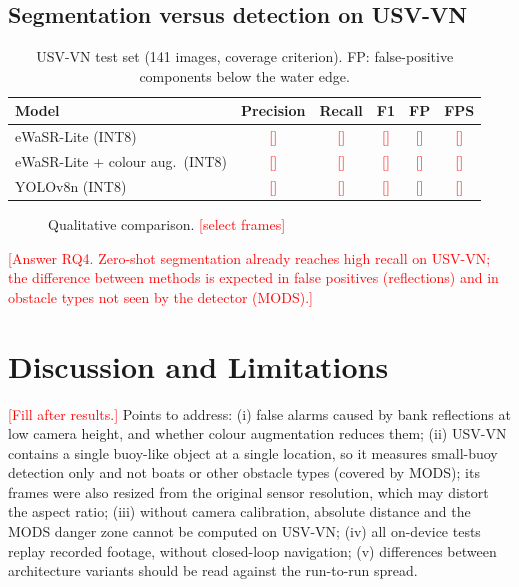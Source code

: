 \documentclass[conference]{IEEEtran}
\newcommand{\tbd}[1]{\textcolor{red}{[#1]}}
\newcommand{\figplaceholder}[2]{\fbox{\parbox[c][#2][c]{0.95\linewidth}{\centering\small\textcolor{red}{#1}}}}
\begin{document}
\subsection{Segmentation versus detection on USV-VN}
\label{sec:yolo}
\begin{table}[t]
\centering
\caption{USV-VN test set (141 images, coverage criterion). FP: false-positive components below the water edge.}
\label{tab:yolo}
\setlength{\tabcolsep}{4pt}
\begin{tabular}{lccccc}
\toprule
Model & Precision & Recall & F1 & FP & FPS \\
\midrule
eWaSR-Lite (INT8)                  & \tbd{} & \tbd{} & \tbd{} & \tbd{} & \tbd{} \\
eWaSR-Lite + colour aug.\ (INT8)   & \tbd{} & \tbd{} & \tbd{} & \tbd{} & \tbd{} \\
YOLOv8n (INT8)                  & \tbd{} & \tbd{} & \tbd{} & \tbd{} & \tbd{} \\
\bottomrule
\end{tabular}
\end{table}

\begin{figure}[t]
\centering
\figplaceholder{Fig.~4: qualitative examples — (a) obstacle found by segmentation but missed by YOLOv8n; (b) false alarms on bank reflections; (c) MODS frame with an object class absent from USV-VN.}{3.6cm}
\caption{Qualitative comparison. \tbd{select frames}}
\label{fig:qual}
\end{figure}
\tbd{Answer RQ4. Zero-shot segmentation already reaches high recall on USV-VN; the difference between methods is expected in false positives (reflections) and in obstacle types not seen by the detector (MODS).}

\section{Discussion and Limitations}
\tbd{Fill after results.} Points to address: (i) false alarms caused by bank reflections at low camera height, and whether colour augmentation reduces them; (ii) USV-VN contains a single buoy-like object at a single location, so it measures small-buoy detection only and not boats or other obstacle types (covered by MODS); its frames were also resized from the original sensor resolution, which may distort the aspect ratio; (iii) without camera calibration, absolute distance and the MODS danger zone cannot be computed on USV-VN; (iv) all on-device tests replay recorded footage, without closed-loop navigation; (v) differences between architecture variants should be read against the run-to-run spread.
\end{document}
